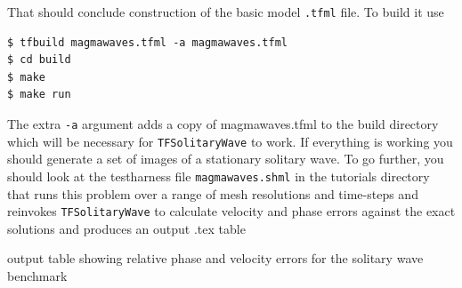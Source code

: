 That should conclude construction of the basic model \texttt{.tfml}
file.  To build it use
\begin{lstlisting}[style=Bash]
$ tfbuild magmawaves.tfml -a magmawaves.tfml
$ cd build
$ make
$ make run 
\end{lstlisting}
The extra \texttt{-a} argument adds a copy of magmawaves.tfml to the
build directory which will be necessary for \texttt{TFSolitaryWave} to
work.  If everything is working you should generate a set of images of a
stationary solitary wave.  To go further, you should look at the
testharness file \texttt{magmawaves.shml} in the tutorials directory
that runs this problem over a range of mesh resolutions and time-steps
and reinvokes \texttt{TFSolitaryWave} to calculate velocity and phase
errors against the exact solutions and produces an output .tex table
\begin{table}[h]
  \centering
  \caption{output table showing relative phase and velocity errors for the
    solitary wave benchmark}
  \label{benchmark_table}
  
\end{table}





